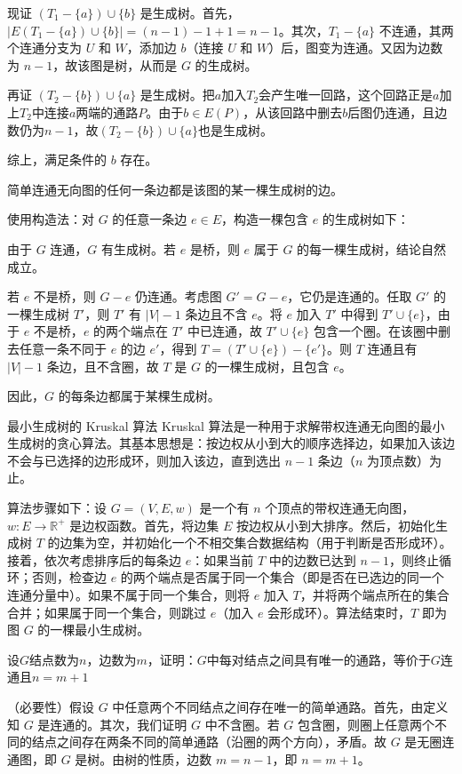 \documentclass[lang=cn,11pt]{elegantbook}
\begin{document}
现证 $(T_1-\{a\})\cup\{b\}$ 是生成树。首先，$|E(T_1-\{a\})\cup\{b\}| = (n-1)-1+1 = n-1$。其次，$T_1-\{a\}$ 不连通，其两个连通分支为 $U$ 和 $W$，添加边 $b$（连接 $U$ 和 $W$）后，图变为连通。又因为边数为 $n-1$，故该图是树，从而是 $G$ 的生成树。

再证 $(T_2-\{b\})\cup\{a\}$ 是生成树。把$a$加入$T_2$会产生唯一回路，这个回路正是$a$加上$T_2$中连接$a$两端的通路$P$。由于$b\in E(P)$，从该回路中删去$b$后图仍连通，且边数仍为$n-1$，故$(T_2-\{b\})\cup\{a\}$也是生成树。

综上，满足条件的 $b$ 存在。
\begin{theorem}
    简单连通无向图的任何一条边都是该图的某一棵生成树的边。
\end{theorem}
使用构造法：对 $G$ 的任意一条边 $e \in E$，构造一棵包含 $e$ 的生成树如下：
    
由于 $G$ 连通，$G$ 有生成树。若 $e$ 是桥，则 $e$ 属于 $G$ 的每一棵生成树，结论自然成立。
    
若 $e$ 不是桥，则 $G-e$ 仍连通。考虑图 $G' = G-e$，它仍是连通的。任取 $G'$ 的一棵生成树 $T'$，则 $T'$ 有 $|V|-1$ 条边且不含 $e$。将 $e$ 加入 $T'$ 中得到 $T' \cup \{e\}$，由于 $e$ 不是桥，$e$ 的两个端点在 $T'$ 中已连通，故 $T' \cup \{e\}$ 包含一个圈。在该圈中删去任意一条不同于 $e$ 的边 $e'$，得到 $T = (T' \cup \{e\}) - \{e'\}$。则 $T$ 连通且有 $|V|-1$ 条边，且不含圈，故 $T$ 是 $G$ 的一棵生成树，且包含 $e$。
    
因此，$G$ 的每条边都属于某棵生成树。

\begin{theorem}{最小生成树的 Kruskal 算法}
    Kruskal 算法是一种用于求解带权连通无向图的最小生成树的贪心算法。其基本思想是：按边权从小到大的顺序选择边，如果加入该边不会与已选择的边形成环，则加入该边，直到选出 $n-1$ 条边（$n$ 为顶点数）为止。

    算法步骤如下：设 $G=(V,E,w)$ 是一个有 $n$ 个顶点的带权连通无向图，$w:E\to \mathbb{R}^+$ 是边权函数。首先，将边集 $E$ 按边权从小到大排序。然后，初始化生成树 $T$ 的边集为空，并初始化一个不相交集合数据结构（用于判断是否形成环）。接着，依次考虑排序后的每条边 $e$：如果当前 $T$ 中的边数已达到 $n-1$，则终止循环；否则，检查边 $e$ 的两个端点是否属于同一个集合（即是否在已选边的同一个连通分量中）。如果不属于同一个集合，则将 $e$ 加入 $T$，并将两个端点所在的集合合并；如果属于同一个集合，则跳过 $e$（加入 $e$ 会形成环）。算法结束时，$T$ 即为图 $G$ 的一棵最小生成树。
\end{theorem}
\begin{example}
    设$G$结点数为$n$，边数为$m$，证明：$G$中每对结点之间具有唯一的通路，等价于$G$连通且$n=m+1$
\end{example}
（必要性）假设 $G$ 中任意两个不同结点之间存在唯一的简单通路。首先，由定义知 $G$ 是连通的。其次，我们证明 $G$ 中不含圈。若 $G$ 包含圈，则圈上任意两个不同的结点之间存在两条不同的简单通路（沿圈的两个方向），矛盾。故 $G$ 是无圈连通图，即 $G$ 是树。由树的性质，边数 $m = n-1$，即 $n = m+1$。
\end{document}

